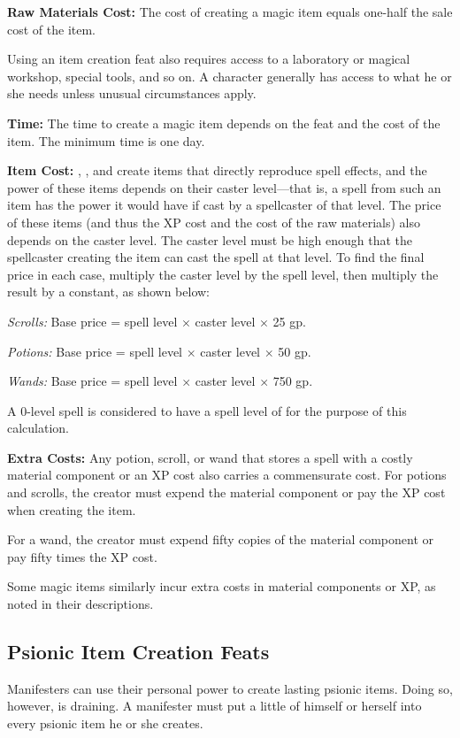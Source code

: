 \textbf{Raw Materials Cost:} The cost of creating a magic item equals one-half the sale cost of the item.

Using an item creation feat also requires access to a laboratory or magical workshop, special tools, and so on. A character generally has access to what he or she needs unless unusual circumstances apply.

\textbf{Time:} The time to create a magic item depends on the feat and the cost of the item. The minimum time is one day.

\textbf{Item Cost:} , , and  create items that directly reproduce spell effects, and the power of these items depends on their caster level---that is, a spell from such an item has the power it would have if cast by a spellcaster of that level. The price of these items (and thus the XP cost and the cost of the raw materials) also depends on the caster level. The caster level must be high enough that the spellcaster creating the item can cast the spell at that level. To find the final price in each case, multiply the caster level by the spell level, then multiply the result by a constant, as shown below:

\textit{Scrolls:} Base price = spell level $\times$ caster level $\times$ 25 gp.

\textit{Potions:} Base price = spell level $\times$ caster level $\times$ 50 gp.

\textit{Wands:} Base price = spell level $\times$ caster level $\times$ 750 gp.

A 0-level spell is considered to have a spell level of \onehalf for the purpose of this calculation.

\textbf{Extra Costs:} Any potion, scroll, or wand that stores a spell with a costly material component or an XP cost also carries a commensurate cost. For potions and scrolls, the creator must expend the material component or pay the XP cost when creating the item.

For a wand, the creator must expend fifty copies of the material component or pay fifty times the XP cost.

Some magic items similarly incur extra costs in material components or XP, as noted in their descriptions.


\subsection{Psionic Item Creation Feats}
Manifesters can use their personal power to create lasting psionic items. Doing so, however, is draining. A manifester must put a little of himself or herself into every psionic item he or she creates.

